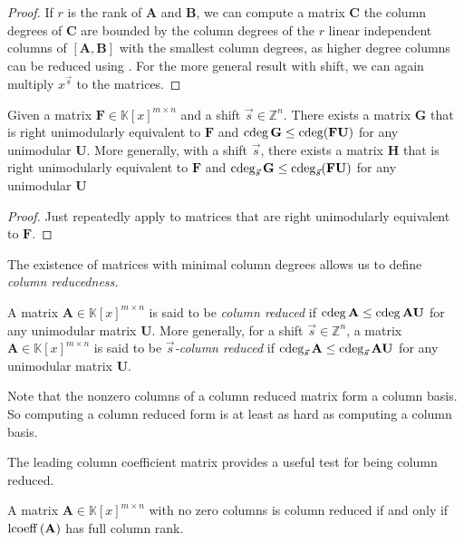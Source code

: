 \begin{proof}
If $r$ is the rank of $\mathbf{A}$ and $\mathbf{B}$, we can compute
a matrix $\mathbf{C}$ the column degrees of $\mathbf{C}$ are bounded
by the column degrees of the $r$ linear independent columns of $\left[\mathbf{A},\mathbf{B}\right]$
with the smallest column degrees, as higher degree columns can be
reduced using . For
the more general result with shift, we can again multiply $x^{\vec{s}}$
to the matrices.\end{proof}
\begin{cor}
\label{cor:minimalUnimodularEquivalentMatrix}Given a matrix $\mathbf{F}\in\mathbb{K}\left[x\right]^{m\times n}$
and a shift $\vec{s}\in\mathbb{Z}^{n}$. There exists a matrix $\mathbf{G}$
that is right unimodularly equivalent to $\mathbf{F}$ and $\cdeg\mathbf{G}\le\cdeg(\mathbf{F}\mathbf{U})$
for any unimodular $\mathbf{U}$. More generally, with a shift $\vec{s}$,
there exists a matrix $\mathbf{H}$ that is right unimodularly equivalent
to $\mathbf{F}$ and $\cdeg_{\vec{s}}\mathbf{G}\le\cdeg_{\vec{s}}(\mathbf{F}\mathbf{U})$
for any unimodular $\mathbf{U}$\end{cor}
\begin{proof}
Just repeatedly apply  to matrices
that are right unimodularly equivalent to $\mathbf{F}$. 
\end{proof}
The existence of matrices with minimal column degrees allows us to
define \emph{column reducedness.}
\begin{defn}
A matrix $\mathbf{A}\in\mathbb{K}\left[x\right]^{m\times n}$ is said
to be \emph{column reduced} if $\cdeg\mathbf{A}\le\cdeg\mathbf{A}\mathbf{U}$
for any unimodular matrix $\mathbf{U}$. More generally, for a shift
$\vec{s}\in\mathbb{Z}^{n}$, a matrix $\mathbf{A}\in\mathbb{K}\left[x\right]^{m\times n}$
is said to be $\vec{s}$\emph{-column reduced} if $\cdeg_{\vec{s}}\mathbf{A}\le\cdeg_{\vec{s}}\mathbf{A}\mathbf{U}$
for any unimodular matrix $\mathbf{U}$.

Note that the nonzero columns of a column reduced matrix form a column
basis. So computing a column reduced form is at least as hard as computing
a column basis.

The leading column coefficient matrix provides a useful test for being
column reduced.\end{defn}
\begin{lem}
\label{lem:columnReducedLeadingCoefficient}A matrix $\mathbf{A}\in\mathbb{K}\left[x\right]^{m\times n}$
with no zero columns is column reduced if and only if \textup{$\operatorname{lcoeff}\left(\mathbf{A}\right)$
has full column rank.}\end{lem}
